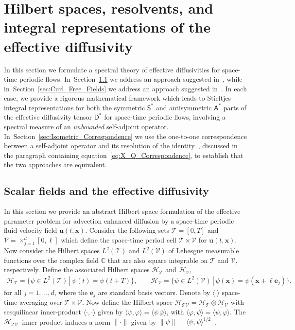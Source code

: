 \documentclass[leqno,onefignum,onetabnum]{siamltex1213}
\newcommand{\secref}[1]{Section~\ref{#1}}
\newcommand{\Tc}{\mathcal{T}}
\newcommand{\Vc}{\mathcal{V}}
\newcommand{\Dm}{\mathsf{D}}
\newcommand{\Sm}{\mathsf{S}}
\newcommand{\Am}{\mathsf{A}}
\newcommand{\Hs}{\mathscr{H}}
\newcommand{\vecx}{\boldsymbol{x}}
\newcommand{\vecu}{\boldsymbol{u}}
\newcommand{\vece}{\boldsymbol{e}}
\begin{document}
\section{Hilbert spaces, resolvents, and integral representations of the effective diffusivity}
\label{sec:Hilbert_Resolvent_Integral_Reps} 
%
In this section we formulate a spectral theory of effective
diffusivities for space-time periodic
flows. In~\secref{sec:Scalar_Fields} we address an approach suggested
in~\cite{Pavliotis:PHD_Thesis}, while in~\secref{sec:Curl_Free_Fields}
we address an approach suggested in~\cite{Avellaneda:PRE:3249}. In 
each case, we provide a rigorous mathematical framework which leads to
Stieltjes integral representations for both the symmetric $\Sm^*$ and
antisymmetric $\Am^*$ parts of the effective diffusivity tensor
$\Dm^*$ for space-time periodic
flows, involving a spectral measure of an \emph{unbounded}
self-adjoint operator. In~\secref{sec:Isometric_Correspondence} we use
the one-to-one correspondence between a self-adjoint operator and its
resolution of the identity~\cite{Stone:64}, discussed in the paragraph
containing equation~\eqref{eq:X_Q_Correspondence}, to establish that
the two approaches are equivalent.  



\subsection{Scalar fields and the effective diffusivity}\label{sec:Scalar_Fields}
%
In this section we provide an abstract Hilbert space formulation of
the effective parameter problem for advection enhanced diffusion by a
space-time periodic fluid velocity field $\vecu(t,\vecx)$. Consider
the following sets $\Tc=[0,T]$ and $\Vc=\times_{j=1}^d[0,\ell]$ which 
define the space-time period cell $\Tc\times\Vc$ for $\vecu(t,\vecx)$. Now
consider the Hilbert spaces $L^2(\Tc)$ and $L^2(\Vc)$ of Lebesgue measurable
functions over the complex field $\mathbb{C}$ that are also square
integrable on $\Tc$ and $\Vc$, respectively. Define the associated
Hilbert spaces $\Hs_{\Tc}$ and $\Hs_{\Vc}$,
%
\begin{align}\label{eq:Hilbert_Spaces_scalar}
  \Hs_{\Tc}=\big\{\psi\in L^2(\Tc) \, | \, \psi(t)=\psi(t+T)\big\},
  \qquad
  \Hs_{\Vc}=\big\{\psi\in L^2(\Vc) \, | \, \psi(\vecx)=\psi(\vecx+\ell\vece_j)\big\},
\end{align}
%
for all $j=1,\ldots,d$, where the $\vece_j$ are standard basis vectors. Denote by 
$\langle\cdot\rangle$ space-time averaging over $\Tc\times\Vc$. Now define the Hilbert space 
$\Hs_{\Tc\Vc}=\Hs_{\Tc}\otimes\Hs_{\Vc}$ with sesquilinear
inner-product $\langle\cdot,\cdot\rangle$ given by $\langle\psi,\varphi\rangle=\langle\psi\,\overline{\varphi}\rangle$, with
$\langle\varphi,\psi\rangle=\overline{\langle\psi,\varphi\rangle}$. The $\Hs_{\Tc\Vc}$--inner-product induces a
norm $\|\cdot\|$ given by  $\|\psi\|=\langle\psi,\psi\rangle^{1/2}$~\cite{Folland:99:RealAnalysis}. 
\end{document}
